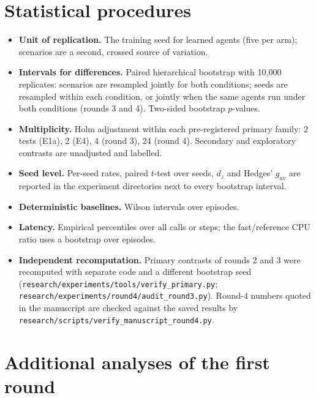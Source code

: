 \documentclass[11pt]{article}
\begin{document}
\section{Statistical procedures}
\begin{itemize}
  \item \textbf{Unit of replication.} The training seed for learned agents (five per arm); scenarios are a second, crossed source of variation.
  \item \textbf{Intervals for differences.} Paired hierarchical bootstrap with 10{,}000 replicates: scenarios are resampled jointly for both conditions; seeds are resampled within each condition, or jointly when the same agents run under both conditions (rounds 3 and 4). Two-sided bootstrap $p$-values.
  \item \textbf{Multiplicity.} Holm adjustment within each pre-registered primary family: 2 tests (E1a), 2 (E4), 4 (round 3), 24 (round 4). Secondary and exploratory contrasts are unadjusted and labelled.
  \item \textbf{Seed level.} Per-seed rates, paired $t$-test over seeds, $d_z$ and Hedges' $g_{av}$ are reported in the experiment directories next to every bootstrap interval.
  \item \textbf{Deterministic baselines.} Wilson intervals over episodes.
  \item \textbf{Latency.} Empirical percentiles over all calls or steps; the fast/reference CPU ratio uses a bootstrap over episodes.
  \item \textbf{Independent recomputation.} Primary contrasts of rounds 2 and 3 were recomputed with separate code and a different bootstrap seed (\nolinkurl{research/experiments/tools/verify_primary.py}; \nolinkurl{research/experiments/round4/audit_round3.py}). Round-4 numbers quoted in the manuscript are checked against the saved results by \nolinkurl{research/scripts/verify_manuscript_round4.py}.
\end{itemize}

\section{Additional analyses of the first round}
\end{document}
